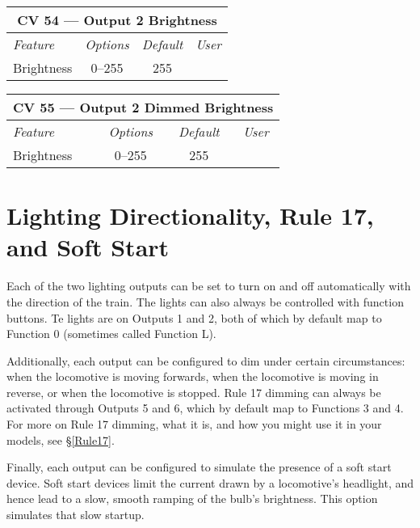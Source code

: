 \documentclass[12pt,letterpaper,draft]{memoir} %
\begin{document}
\label{CV54}
\begin{center}
\begin{tabular}{|l|c|c|c|}
\hline
\multicolumn{4}{|c|}{\textbf{CV 54 --- Output 2 Brightness}} \\ \hline \hline
\textit{Feature} & \textit{Options} & \textit{Default} & \textit{User} \\ \hline
Brightness & 0--255 & 255 &\\ \hline
\end{tabular}
\end{center}

\label{CV55}
\begin{center}
\begin{tabular}{|l|c|c|c|}
\hline
\multicolumn{4}{|c|}{\textbf{CV 55 --- Output 2 Dimmed Brightness}} \\ \hline \hline
\textit{Feature} & \textit{Options} & \textit{Default} & \textit{User} \\ \hline
Brightness & 0--255 & 255 &\\ \hline
\end{tabular}
\end{center}

\section{Lighting Directionality, Rule 17, and Soft Start}

Each of the two lighting outputs can be set to turn on and off automatically with the direction of the train. The lights can also always be controlled with function buttons. Te lights are on Outputs 1 and 2, both of which by default map to Function 0 (sometimes called Function L).

\label{configRule17}Additionally, each output can be configured to dim under certain circumstances: when the locomotive is moving forwards, when the locomotive is moving in reverse, or when the locomotive is stopped. Rule 17 dimming can always be activated through Outputs 5 and 6, which by default map to Functions 3 and 4. For more on Rule 17 dimming, what it is, and how you might use it in your models, see \S\ref{Rule17}.

\label{configSoftStart}Finally, each output can be configured to simulate the presence of a soft start device. Soft start devices limit the current drawn by a locomotive's headlight, and hence lead to a slow, smooth ramping of the bulb's brightness. This option simulates that slow startup.
\end{document}
